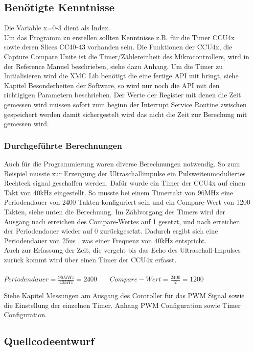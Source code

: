 \subsection{Benötigte Kenntnisse}
Die Variable x=0-3 dient als Index.\\
Um das Programm zu erstellen sollten Kenntnisse z.B. für die Timer CCU4x sowie deren Slices CC40-43 vorhanden sein. Die Funktionen der CCU4x, die Capture Compare Unite ist die Timer/Zählereinheit des Mikrocontrollers, wird in der Reference Manuel beschrieben, siehe dazu Anhang. Um die Timer zu Initialisieren wird die XMC Lib benötigt die eine fertige API mit bringt, siehe Kapitel Besonderheiten der Software, so wird nur noch die API mit den richtigigen Parametern beschrieben. Der Werte der Register mit denen die Zeit gemessen wird müssen sofort zum beginn der Interrupt Service Routine zwischen gespeichert werden damit sichergestelt wird das nicht die Zeit zur Berechung mit gemessen wird.\\

\subsubsection{Durchgeführte Berechnungen}
Auch für die Programmierung waren diverse Berechnungen notwendig. So zum Beispiel musste zur Erzeugung der Ultraschallimpulse ein Pulsweitenmoduliertes Rechteck signal geschaffen werden. Dafür wurde ein Timer der CCU4x auf einen Takt von 40kHz eingestellt. So musste bei einem Timertakt von 96MHz eine Periodendauer von 2400 Takten konfiguriert sein und ein Compare-Wert von 1200 Takten, siehe unten die Berechnung. Im Zählvorgang des Timers wird der Ausgang nach erreichen des Compare-Wertes auf 1 gesetzt, und nach erreichen der Periodendauer wieder auf 0 zurückgesetzt. Dadurch ergibt sich eine Periodendauer von 25us , was einer Frequenz von 40kHz entspricht.\\
Auch zur Erfassung der Zeit, die vergeht bis das Echo des Ultraschall-Impulses zurück kommt wird über einen Timer der CCU4x erfasst. 
\onehalfspacing \\ \\
\(\displaystyle Periodendauer=\frac{96MHz}{40kHz} = 2400 \)  \  \  \    \(\displaystyle Compare-Wert=\frac{2400}{2} = 1200 \) 
\singlespacing

Siehe Kapitel Messungen am Ausgang des Controller für das PWM Signal sowie die Einstellung der einzelnen Timer, Anhang PWM Configuration sowie Timer Configuration.

\subsection{Quellcodeentwurf}

